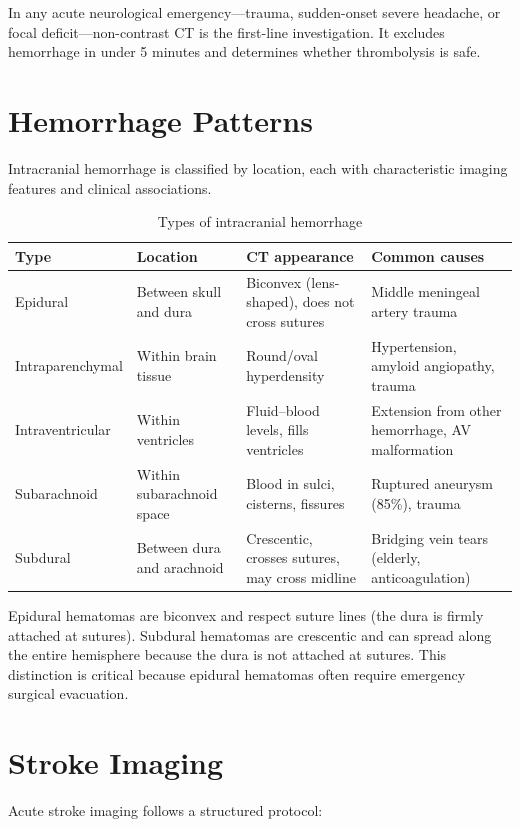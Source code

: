 \begin{pearlbox}
In any acute neurological emergency---trauma, sudden-onset severe headache, or focal deficit---non-contrast CT is the first-line investigation. It excludes hemorrhage in under 5 minutes and determines whether thrombolysis is safe.
\end{pearlbox}


\section{Hemorrhage Patterns}
Intracranial hemorrhage is classified by location, each with characteristic imaging features and clinical associations.

\begin{table}[h]
\centering
\caption{Types of intracranial hemorrhage}
\begin{tabular}{p{2.8cm} p{3.5cm} p{3.5cm} p{3.5cm}}
\hline
\textbf{Type} & \textbf{Location} & \textbf{CT appearance} & \textbf{Common causes} \\
\hline
Epidural & Between skull and dura & Biconvex (lens-shaped), does not cross sutures & Middle meningeal artery trauma \\
Intraparenchymal & Within brain tissue & Round/oval hyperdensity & Hypertension, amyloid angiopathy, trauma \\
Intraventricular & Within ventricles & Fluid--blood levels, fills ventricles & Extension from other hemorrhage, AV malformation \\
Subarachnoid & Within subarachnoid space & Blood in sulci, cisterns, fissures & Ruptured aneurysm (85\%), trauma \\
Subdural & Between dura and arachnoid & Crescentic, crosses sutures, may cross midline & Bridging vein tears (elderly, anticoagulation) \\
\hline
\end{tabular}
\end{table}

\begin{pearlbox}
Epidural hematomas are biconvex and respect suture lines (the dura is firmly attached at sutures). Subdural hematomas are crescentic and can spread along the entire hemisphere because the dura is not attached at sutures. This distinction is critical because epidural hematomas often require emergency surgical evacuation.
\end{pearlbox}


\section{Stroke Imaging}
Acute stroke imaging follows a structured protocol:

